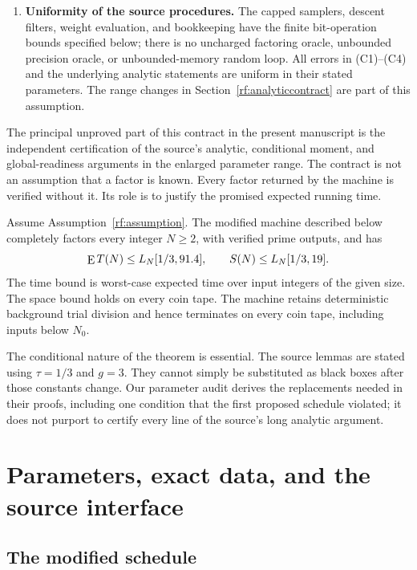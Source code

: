 \begin{assumption}
\begin{enumerate}[label=\textup{(C\arabic*)},leftmargin=*]
\item \textbf{Uniformity of the source procedures.}
The capped samplers, descent filters, weight evaluation, and
bookkeeping have the finite bit-operation bounds specified below;
there is no uncharged factoring oracle, unbounded precision oracle,
or unbounded-memory random loop.  All errors in \textup{(C1)}--\textup{(C4)}
and the underlying analytic statements are uniform in their stated
parameters.  The range changes in
Section~\ref{rf:analyticcontract} are part of this assumption.
\end{enumerate}
\end{assumption}

The principal unproved part of this contract in the present manuscript
is the independent certification of the source's analytic, conditional
moment, and global-readiness arguments in the enlarged parameter
range.  The contract is not an assumption that a factor is known.
Every factor returned by the machine is verified without it.  Its
role is to justify the promised expected running time.

\begin{theorem}
\label{rf:main}
Assume Assumption~\ref{rf:assumption}.  The modified machine described
below completely factors every integer $N\ge2$, with verified prime
outputs, and has
\[
 \mathop{\rm E} T(N)\le L_N[1/3,91.4],\qquad
 S(N)\le L_N[1/3,19].
\]
The time bound is worst-case expected time over input integers of
the given size.  The space bound holds on every coin tape.  The
machine retains deterministic background trial division and hence
terminates on every coin tape, including inputs below $N_0$.
\end{theorem}

The conditional nature of the theorem is essential.  The source
lemmas are stated using $\tau=1/3$ and $g=3$.  They cannot simply be
substituted as black boxes after those constants change.  Our
parameter audit derives the replacements needed in their proofs,
including one condition that the first proposed schedule violated;
it does not purport to certify every line of the source's long
analytic argument.

\section{Parameters, exact data, and the source interface}
\label{rf:parameters}

\subsection{The modified schedule}

